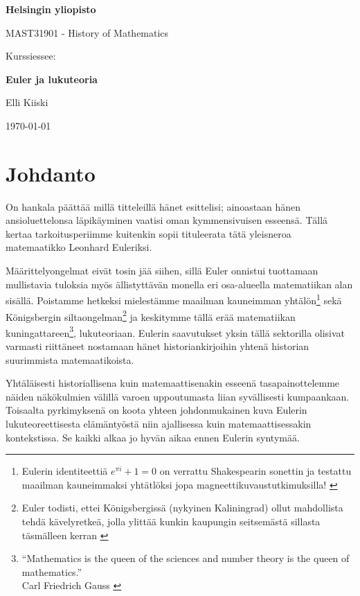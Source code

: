 \documentclass[a4paper,11pt]{article}
\begin{document}
{
\thispagestyle{empty}
{\large
\textbf{Helsingin yliopisto}
\par
MAST31901 - History of Mathematics
}

\vspace{7cm}

{\huge
Kurssiessee:}
\par
{\Large \bf Euler ja lukuteoria}

\vspace{2cm}

{\Large Elli Kiiski}

\vfill

{\large \today}
}

\clearpage


\section{Johdanto}

On hankala päättää millä titteleillä hänet esittelisi; ainoastaan hänen ansioluettelonsa läpikäyminen vaatisi oman kymmensivuisen esseensä. Tällä kertaa tarkoitusperiimme kuitenkin sopii tituleerata tätä yleisneroa matemaatikko Leonhard Euleriksi.

Määrittelyongelmat eivät tosin jää siihen, sillä Euler onnistui tuottamaan mullistavia tuloksia myös ällistyttävän monella eri osa-alueella matematiikan alan sisällä. Poistamme hetkeksi mielestämme maailman kauneimman yhtälön\footnote{Eulerin identiteettiä $e^{\pi i}+1=0$ on verrattu Shakespearin sonettin ja testattu maailman kauneimmaksi yhtätlöksi jopa magneettikuvaustutkimuksilla! \cite{identity}} sekä Königsbergin siltaongelman\footnote{Euler todisti, ettei Königsbergissä (nykyinen Kaliningrad) ollut mahdollista tehdä kävelyretkeä, jolla ylittää kunkin kaupungin seitsemästä sillasta täsmälleen kerran \cite{silta}} ja keskitymme tällä erää matematiikan kuningattareen\footnote{\enquote{Mathematics is the queen of the sciences and number theory is the queen of mathematics.}\\Carl Friedrich Gauss \cite{quotes}}, lukuteoriaan. Eulerin saavutukset yksin tällä sektorilla olisivat varmasti riittäneet nostamaan hänet historiankirjoihin yhtenä historian suurimmista matemaatikoista.

Yhtäläisesti historiallisena kuin matemaattisenakin esseenä tasapainottelemme näiden näkökulmien välillä varoen uppoutumasta liian syvällisesti kumpaankaan. Toisaalta pyrkimyksenä on koota yhteen johdonmukainen kuva Eulerin lukuteoreettisesta elämäntyöstä niin ajallisessa kuin matemaattisessakin kontekstissa. Se kaikki alkaa jo hyvän aikaa ennen Eulerin syntymää.
\end{document}

